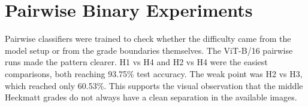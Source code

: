 \begin{table}[H]
\centering
\scriptsize
{}
\caption{Selected hyperparameter search results}
\label{tab:hparam_search}
\end{table}

\section{Pairwise Binary Experiments}
Pairwise classifiers were trained to check whether the difficulty came from the model setup or from the grade boundaries themselves. The ViT-B/16 pairwise runs made the pattern clearer. H1 vs H4 and H2 vs H4 were the easiest comparisons, both reaching 93.75\% test accuracy. The weak point was H2 vs H3, which reached only 60.53\%. This supports the visual observation that the middle Heckmatt grades do not always have a clean separation in the available images.

\begin{table}[H]
\centering
\scriptsize
{}
\caption{ViT-B/16 pairwise binary classification results}
\label{tab:vit_pairwise}
\end{table}

